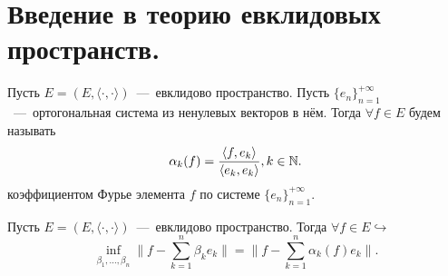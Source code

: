 \newpage

\section{Введение в теорию евклидовых пространств.}
\begin{definition}
    Пусть $E = (E, \langle \cdot, \cdot \rangle)$~---~евклидово пространство. Пусть $\{e_n\}_{n = 1}^{+\infty}$~---~ортогональная система из ненулевых векторов в нём.
    Тогда $\forall f \in E$ будем называть
    \begin{equation*}
        \alpha_k(f) = \dfrac{\langle f, e_k \rangle}{\langle e_k, e_k \rangle}, k \in \mathbb{N}.
    \end{equation*}
    коэффициентом Фурье элемента $f$ по системе $\{e_n\}_{n = 1}^{+\infty}$.
\end{definition}
\begin{theorem}
    Пусть $E = (E, \langle \cdot, \cdot \rangle)$~---~евклидово пространство. Тогда $\forall f \in E \hookrightarrow$
    \begin{equation*}
        \inf\limits_{\beta_1, \ldots, \beta_n} \bigr\|f - \sum\limits_{k = 1}^n \beta_k e_k\bigr\| = \bigr\|f - \sum\limits_{k = 1}^n \alpha_k(f)e_k\bigr\|.
    \end{equation*}
\end{theorem}
